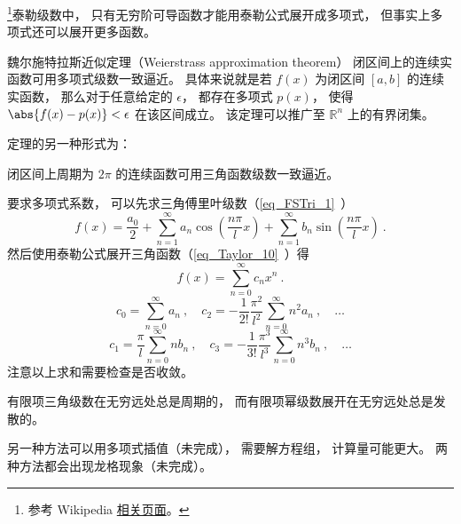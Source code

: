 \begin{issues}
\issueDraft
\end{issues}


\footnote{参考 Wikipedia \href{https://en.wikipedia.org/wiki/Stone\%E2\%80\%93Weierstrass_theorem}{相关页面}。}泰勒级数中， 只有无穷阶可导函数才能用泰勒公式展开成多项式， 但事实上多项式还可以展开更多函数。

\begin{theorem}{魏尔施特拉斯近似定理（Weierstrass approximation theorem）}
闭区间上的连续实函数可用多项式级数一致逼近。 具体来说就是若 $f(x)$ 为闭区间 $[a, b]$ 的连续实函数， 那么对于任意给定的 $\epsilon$， 都存在多项式 $p(x)$， 使得 $\abs{f(x) - p(x)} < \epsilon$ 在该区间成立。 该定理可以推广至 $\mathbb {R}^{n}$ 上的有界闭集。
\end{theorem}

定理的另一种形式为：
\begin{theorem}{}
闭区间上周期为 $2\pi$ 的连续函数可用三角函数级数一致逼近。
\end{theorem}

要求多项式系数， 可以先求三角傅里叶级数（\autoref{eq_FSTri_1}~）
\begin{equation}
f(x) = \frac{a_0}{2} + \sum_{n = 1}^\infty a_n \cos (\frac{n\pi}{l}x) + \sum_{n = 1}^\infty b_n \sin (\frac{n\pi}{l}x)~.
\end{equation}
然后使用泰勒公式展开三角函数（\autoref{eq_Taylor_10}~）得
\begin{equation}
f(x) = \sum_{n=0}^\infty c_n x^n~.
\end{equation}
\begin{equation}
c_0 = \sum_{n=0}^\infty a_n~,
\quad
c_2 = -\frac{1}{2!}\frac{\pi^2}{l^2} \sum_{n=0}^\infty n^2 a_n~, \quad \dots
\end{equation}
\begin{equation}
c_1 = \frac{\pi}{l} \sum_{n=0}^\infty n b_n~,
\quad
c_3 = -\frac{1}{3!}\frac{\pi^3}{l^3} \sum_{n=0}^\infty n^3 b_n~, \quad \dots
\end{equation}
注意以上求和需要检查是否收敛。

有限项三角级数在无穷远处总是周期的， 而有限项幂级数展开在无穷远处总是发散的。

另一种方法可以用多项式插值（未完成）， 需要解方程组， 计算量可能更大。 两种方法都会出现龙格现象（未完成）。
